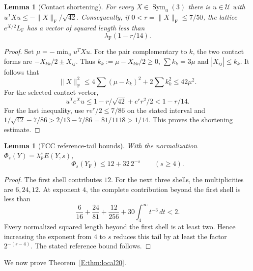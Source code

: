 \documentclass[reqno,english]{amsart}
\newtheorem{lemma}[theorem]{Lemma}
\theoremstyle{definition}
\newtheorem{open problem}[theorem]{Open Problem}
\theoremstyle{remark}
\theoremstyle{plain}
\numberwithin{equation}{section}
\newcommand{\FCC}{L_{\mathrm F}}
\newcommand{\YF}{Y_{\mathrm F}}
\newcommand{\norm}[1]{\lVert#1\rVert_{\mathrm F}}
\newcommand{\lam}{\lambda_{\mathrm F}}
\newcommand{\Symzero}{\operatorname{Sym}_0(3)}
\begin{document}
\begin{lemma}[Contact shortening]\label{E:lem:shortening}
For every $X\in\Symzero$ there is $u\in\mathcal U$ with
$u^TXu\le-\norm X/\sqrt{42}$. Consequently, if $0<r=\norm X\le7/50$, the lattice $e^{X/2}\FCC$ has a vector of squared length less than
\begin{equation}
 \lam(1-r/14).
 \label{E:eq:shortening}
\end{equation}
\end{lemma}
\begin{proof}
Set $\mu=-\min_u u^TXu$. For the pair complementary to $k$,
the two contact forms are $-X_{kk}/2\pm X_{ij}$. Thus
$k_k:=\mu-X_{kk}/2\ge0$, $\sum k_k=3\mu$ and
$|X_{ij}|\le k_k$. It follows that
\[
 \norm X^2\le4\sum(\mu-k_k)^2+2\sum k_k^2
 \le42\mu^2.
\]
For the selected contact vector,
\[
 u^Te^Xu\le1-r/\sqrt{42}+e^rr^2/2<1-r/14.
\]
For the last inequality, use $re^r/2\le7/86$ on the stated
interval and
$1/\sqrt{42}-7/86>2/13-7/86=81/1118>1/14$.
This proves the shortening estimate.
\end{proof}

\begin{lemma}[FCC reference-tail bounds]\label{E:lem:power-reference}
With the normalization $\Phi_s(Y)=\lam^sE(Y,s)$,
\begin{equation}
 \Phi_s(\YF)\le12+32\,2^{-s}\qquad(s\ge4).
 \label{E:eq:reference-tail}
\end{equation}
\end{lemma}
\begin{proof}
The first shell contributes $12$. For the next three shells, the
multiplicities are $6,24,12$. At exponent $4$, the complete
contribution beyond the first shell is less than
\[
 \frac6{16}+\frac{24}{81}+\frac{12}{256}
 +30\int_4^\infty t^{-3}\,dt<2.
\]
Every normalized squared length beyond the first shell is at least
two. Hence increasing the exponent from $4$ to $s$ reduces this
tail by at least the factor $2^{-(s-4)}$. The stated reference
bound follows.
\end{proof}


We now prove Theorem~\ref{E:thm:local20}.
\end{document}
